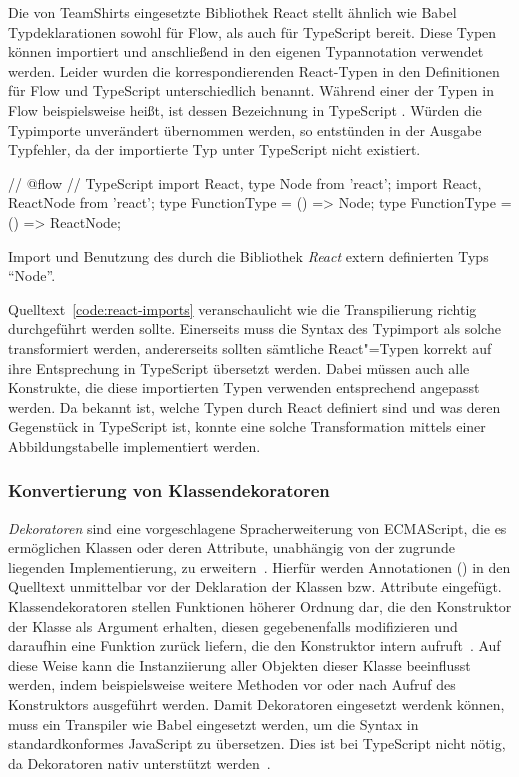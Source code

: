 {Die von TeamShirts eingesetzte Bibliothek React stellt ähnlich wie Babel Typdeklarationen sowohl für Flow, als auch für TypeScript bereit. Diese Typen können importiert und anschließend in den eigenen Typannotation verwendet werden. Leider wurden die korrespondierenden React-Typen in den Definitionen für Flow und TypeScript unterschiedlich benannt. Während einer der Typen in Flow beispielsweise  heißt, ist dessen Bezeichnung in TypeScript . Würden die Typimporte unverändert übernommen werden, so entstünden in der Ausgabe Typfehler, da der importierte Typ unter TypeScript nicht existiert.

\bigbreak
\begin{listing}[htb]
\begin{textcode}
// @flow                                        // TypeScript
import React, { type Node } from 'react';       import React, { ReactNode } from 'react';
type FunctionType = () => Node;                 type FunctionType = () => ReactNode;
\end{textcode}
\listingvspace
\caption{Import und Benutzung des durch die Bibliothek \textit{React} extern definierten Typs \enquote{Node}.}
\label{code:react-imports}
\end{listing}

Quelltext~\ref{code:react-imports} veranschaulicht wie die Transpilierung richtig durchgeführt werden sollte. Einerseits muss die Syntax des Typimport als solche transformiert werden, andererseits sollten sämtliche React"=Typen korrekt auf ihre Entsprechung in TypeScript übersetzt werden. Dabei müssen auch alle Konstrukte, die diese importierten Typen verwenden entsprechend angepasst werden. Da bekannt ist, welche Typen durch React definiert sind und was deren Gegenstück in TypeScript ist, konnte eine solche Transformation mittels einer Abbildungstabelle implementiert werden.

\subsubsection{Konvertierung von Klassendekoratoren}
\label{subsec:class-decorators}

\textit{Dekoratoren} sind eine vorgeschlagene Spracherweiterung von ECMAScript, die es ermöglichen Klassen oder deren Attribute, unabhängig von der zugrunde liegenden Implementierung, zu erweitern~\autocite{ES_PROPOSAL:DECORATORS}. Hierfür werden Annotationen () in den Quelltext unmittelbar vor der Deklaration der Klassen bzw. Attribute eingefügt. Klassendekoratoren stellen Funktionen höherer Ordnung dar, die den Konstruktor der Klasse als Argument erhalten, diesen gegebenenfalls modifizieren und daraufhin eine Funktion zurück liefern, die den Konstruktor intern aufruft~\autocite{ES_PROPOSAL:DECORATORS}. Auf diese Weise kann die Instanziierung aller Objekten dieser Klasse beeinflusst werden, indem beispielsweise weitere Methoden vor oder nach Aufruf des Konstruktors ausgeführt werden. Damit Dekoratoren eingesetzt werdenk können, muss ein Transpiler wie Babel eingesetzt werden, um die Syntax in standardkonformes JavaScript zu übersetzen. Dies ist bei TypeScript nicht nötig, da Dekoratoren nativ unterstützt werden~\autocite{TYPESCRIPT_HANDBOOK:DECORATORS}.

}

